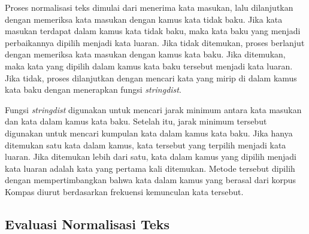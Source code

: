 Proses normalisasi teks dimulai dari menerima kata masukan, lalu dilanjutkan dengan memeriksa kata masukan dengan kamus kata tidak baku. Jika kata masukan terdapat dalam kamus kata tidak baku, maka kata baku yang menjadi perbaikannya dipilih menjadi kata luaran. Jika tidak ditemukan, proses berlanjut dengan memeriksa kata masukan dengan kamus kata baku. Jika ditemukan, maka kata yang dipilih dalam kamus kata baku tersebut menjadi kata luaran. Jika tidak, proses dilanjutkan dengan mencari kata yang mirip di dalam kamus kata baku dengan menerapkan fungsi \textit{stringdist}.

Fungsi \textit{stringdist} digunakan untuk mencari jarak minimum antara kata masukan dan kata dalam kamus kata baku. Setelah itu, jarak minimum tersebut digunakan untuk mencari kumpulan kata dalam kamus kata baku. Jika hanya ditemukan satu kata dalam kamus, kata tersebut yang terpilih menjadi kata luaran. Jika ditemukan lebih dari satu, kata dalam kamus yang dipilih menjadi kata luaran adalah kata yang pertama kali ditemukan. Metode tersebut dipilih dengan mempertimbangkan bahwa kata dalam kamus yang berasal dari korpus Kompas diurut berdasarkan frekuensi kemunculan kata tersebut.

\subsection{Evaluasi Normalisasi Teks}

